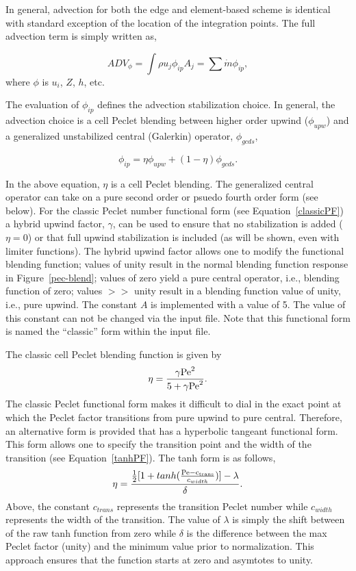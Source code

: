 In general, advection for both the edge and element-based
scheme is identical with standard exception of the location of the integration
points. The full advection term is simply written as,

\begin{equation}
  ADV_{\phi} = \int \rho u_j \phi_{ip} A_j = \sum \dot{m} \phi_{ip},
\label{advForm}
\end{equation}
%
where $\phi$ is $u_i$, $Z$, $h$, etc.

The evaluation of $\phi_{ip}$ defines the advection stabilization choice. 
In general, the advection choice is a cell Peclet blending between higher
order upwind ($\phi_{upw}$) and a generalized unstabilized central 
(Galerkin) operator, $\phi_{gcds}$,

\begin{equation}
  \phi_{ip} = \eta \phi_{upw} + (1-\eta)\phi_{gcds}.
\end{equation}
\label{advPhiIP}
%

In the above equation, $\eta$ is a cell Peclet blending. The generalized
central operator can take on a pure second order or psuedo fourth order form (see below). 
For the classic Peclet number functional form (see Equation~\ref{classicPF}) 
a hybrid upwind factor, $\gamma$, can be used to 
ensure that no stabilization is added ($\eta = 0$) or that full upwind stabilization is included (as will be shown, 
even with limiter functions). The hybrid upwind factor allows one to modify the functional
blending function; values of unity result in the normal blending function 
response in  Figure~\ref{pec-blend}; values of zero yield
a pure central operator, i.e., blending function of zero; values $>>$ unity result 
in a blending function value of unity, i.e., pure upwind. The constant $A$
is implemented with a value of 5. The value of this constant can not be changed
via the input file. Note that this functional form is named the ``classic'' form
within the input file.

The classic cell Peclet blending function is given by
\begin{equation}
  \eta = \frac {{\gamma \rm Pe}^2} {5 + {\gamma \rm Pe}^2}.
\label{classicPF}
\end{equation}
The classic Peclet functional form makes it difficult to dial in the exact
point at which the Peclet factor transitions from pure upwind to pure central. 
Therefore, an alternative form is provided that has a hyperbolic tangeant 
functional form. This form allows one to specify the transition point and 
the width of the transition (see Equation~\ref{tanhPF}).
The tanh form is as follows,
\begin{equation}
  \eta = \frac {\frac {1}{2}[1+tanh(\frac{\rm Pe - c_{trans}}{c_{width}})] -\lambda}{\delta}.
\label{tanhPF}
\end{equation}
Above, the constant $c_{trans}$ represents the transition Peclet number while $c_{width}$ represents the width of 
the transition. The value of $\lambda$ is simply the shift between of the raw tanh function
from zero while $\delta$ is the difference between the max Peclet factor (unity) and the minimum value
prior to normalization. This approach ensures that the function starts at zero and asymtotes to unity. 

